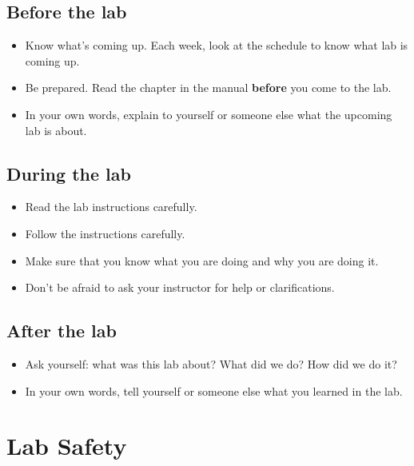 \documentclass[]{book}
\providecommand{\tightlist}{%
  \setlength{\itemsep}{0pt}\setlength{\parskip}{0pt}}
\begin{document}
\hypertarget{before-the-lab}{%
\section*{Before the lab}\label{before-the-lab}}

\begin{itemize}
\tightlist
\item
  Know what's coming up. Each week, look at the schedule to know what lab is coming up.
\item
  Be prepared. Read the chapter in the manual \textbf{before} you come to the lab.
\item
  In your own words, explain to yourself or someone else what the upcoming lab is about.
\end{itemize}

\hypertarget{during-the-lab}{%
\section*{During the lab}\label{during-the-lab}}

\begin{itemize}
\tightlist
\item
  Read the lab instructions carefully.
\item
  Follow the instructions carefully.
\item
  Make sure that you know what you are doing and why you are doing it.
\item
  Don't be afraid to ask your instructor for help or clarifications.
\end{itemize}

\hypertarget{after-the-lab}{%
\section*{After the lab}\label{after-the-lab}}

\begin{itemize}
\tightlist
\item
  Ask yourself: what was this lab about? What did we do? How did we do it?
\item
  In your own words, tell yourself or someone else what you learned in the lab.
\end{itemize}

\hypertarget{lab-safety}{%
\chapter{Lab Safety}\label{lab-safety}}
\end{document}
